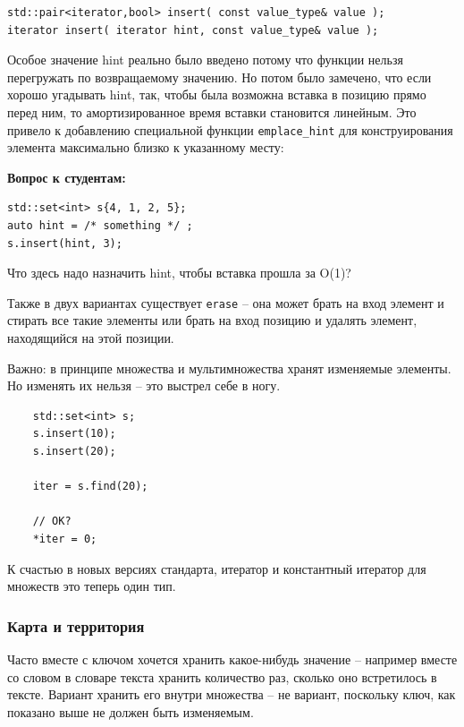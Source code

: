 \documentclass[a4paper,12pt,oneside]{article}
\newif\ifanswers
\begin{document}
\begin{lstlisting}
std::pair<iterator,bool> insert( const value_type& value );
iterator insert( iterator hint, const value_type& value );
\end{lstlisting}

Особое значение hint реально было введено потому что функции нельзя перегружать по возвращаемому значению. Но потом было замечено, что если хорошо угадывать hint, так, чтобы была возможна вставка в позицию прямо перед ним, то амортизированное время вставки становится линейным. Это привело к добавлению специальной функции \lstinline!emplace_hint! для конструирования элемента максимально близко к указанному месту:

\textbf{Вопрос к студентам:}

\begin{lstlisting}
std::set<int> s{4, 1, 2, 5};
auto hint = /* something */ ;
s.insert(hint, 3);
\end{lstlisting}

Что здесь надо назначить hint, чтобы вставка прошла за O(1)?

\ifanswers
Верный ответ: \lstinline!s.upper_bound(3)!
\fi

Также в двух вариантах существует \lstinline!erase! -- она может брать на вход элемент и стирать все такие элементы или брать на вход позицию и удалять элемент, находящийся на этой позиции.

Важно: в принципе множества и мультимножества хранят изменяемые элементы. Но изменять их нельзя -- это выстрел себе в ногу.

\begin{lstlisting}
    std::set<int> s;
    s.insert(10);
    s.insert(20);

    iter = s.find(20);

    // OK?
    *iter = 0;
\end{lstlisting}

К счастью в новых версиях стандарта, итератор и константный итератор для множеств это теперь один тип.

\subsubsection{Карта и территория}

Часто вместе с ключом хочется хранить какое-нибудь значение -- например вместе со словом в словаре текста хранить количество раз, сколько оно встретилось в тексте. Вариант хранить его внутри множества -- не вариант, поскольку ключ, как показано выше не должен быть изменяемым.
\end{document}
